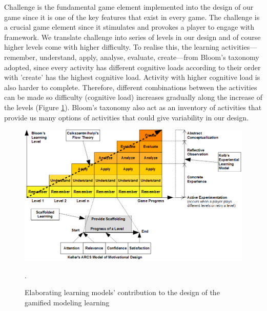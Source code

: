 \documentclass[12pt, a4paper]{report} \usepackage[titletoc]{appendix}
\begin{document}
\begin{appendices}
Challenge is the fundamental game element implemented into the design of our game since it is one of the key features that exist in every game. The challenge is a crucial game element since it stimulates and provokes a player to engage with framework. We translate challenge into series of levels in our design and of course higher levels come with higher difficulty. To realise this, the learning activities---remember, understand, apply, analyse, evaluate, create---from Bloom's taxonomy adopted, since every activity has different cognitive loads according to their order with 'create' has the highest cognitive load. Activity with higher cognitive load is also harder to complete. Therefore, different combinations between the activities can be made so difficulty (cognitive load) increases gradually along the increase of the levels (Figure \ref{learning-models}). Bloom's taxonomy also act as an inventory of activities that provide us many options of activities that could give variability in our design. 

\begin{figure}[ht]
\centering
\includegraphics[width=\textwidth]{learning-models}
\caption{Elaborating learning models' contribution to the design of the gamified modeling learning}.
\label{learning-models}
\end{figure}


\end{appendices}
\end{document}
